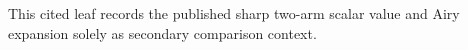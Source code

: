 This cited leaf records the published sharp two-arm scalar value and Airy expansion solely as secondary comparison context.